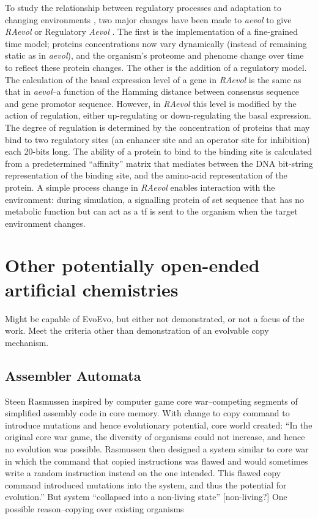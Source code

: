 To study the relationship between regulatory processes and adaptation to changing environments \parencite{Sanchez-Dehesa:2008uq}, two major changes have been made to \emph{aevol} to give \emph{RAevol} or Regulatory \emph{Aevol} \parencite{Beslon:2010zr,Sanchez-Dehesa:2008uq}. The first is the implementation of a fine-grained time model; proteins concentrations now vary dynamically (instead of remaining static as in \emph{aevol}), and the organism's proteome and phenome change over time to reflect these protein changes. The other is the addition of a regulatory model. The calculation of the basal expression level of a gene in \emph{RAevol} is the same as that in \emph{aevol}--a function of the Hamming distance between consensus sequence and gene promotor sequence. However, in \emph{RAevol} this level is modified by the action of regulation, either up-regulating or down-regulating the basal expression. The degree of regulation is determined by the concentration of proteins that may bind to two regulatory sites (an enhancer site and an operator site for inhibition) each 20-bits long. The ability of a protein to bind to the binding site is calculated from a predetermined ``affinity'' matrix that mediates between the DNA bit-string representation of the binding site, and the amino-acid representation of the protein. A simple process change in \emph{RAevol} enables interaction with the environment:  during simulation, a signalling protein of set sequence that has no metabolic function but can act as a \gls{tf} is sent to the organism when the target environment changes.

\section{Other potentially open-ended artificial chemistries}
Might be capable of EvoEvo, but either not demonstrated, or not a focus of the work. Meet the criteria other than demonstration of an evolvable copy mechanism.

\subsection{Assembler Automata}

Steen Rasmussen inspired by computer game core war--competing segments of simplified assembly code in core memory. With change to copy command to introduce mutations and hence evolutionary potential,
core world created: ``In the original core war game, the diversity of organisms could not increase, and hence no evolution was possible. Rasmussen then designed a system similar to core war in which the command that copied instructions was flawed and would sometimes write a random instruction instead on the one intended. This flawed copy command introduced mutations into the system, and thus the potential for evolution.'' \parencite{Ofria2004} 
But system ``collapsed into a non-living state'' {[}non-living?{]} One possible reason--copying over existing organisms \parencite{Ofria2004}

